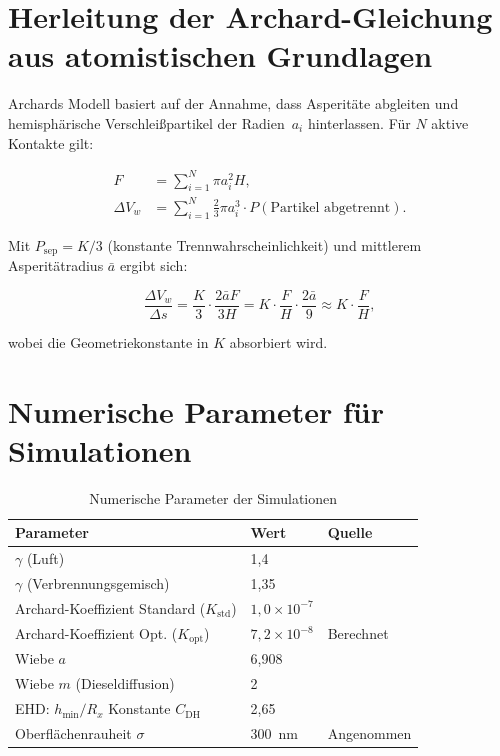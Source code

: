 ﻿\documentclass[12pt,a4paper]{article}
\begin{document}
\appendix
\section{Herleitung der Archard-Gleichung aus atomistischen Grundlagen}
\label{app:archard_herleitung}

Archards Modell basiert auf der Annahme, dass Asperitäte abgleiten und
hemisphärische Verschlei\ss{}partikel der Radien~$a_i$ hinterlassen. Für
$N$ aktive Kontakte gilt:

\begin{align}
  F &= \sum_{i=1}^{N} \pi a_i^2 H, \\
  \Delta V_w &= \sum_{i=1}^{N} \frac{2}{3}\pi a_i^3 \cdot P(\text{Partikel abgetrennt}).
\end{align}

Mit $P_{\mathrm{sep}} = K/3$ (konstante Trennwahrscheinlichkeit) und mittlerem
Asperitätradius $\bar{a}$ ergibt sich:

\begin{equation}
  \frac{\Delta V_w}{\Delta s} = \frac{K}{3} \cdot \frac{2 \bar{a} F}{3H}
  = K \cdot \frac{F}{H} \cdot \frac{2\bar{a}}{9} \approx K \cdot \frac{F}{H},
\end{equation}

wobei die Geometriekonstante in $K$ absorbiert wird.

\section{Numerische Parameter für Simulationen}
\label{app:parameter}

\begin{table}[H]
  \centering
  \caption{Numerische Parameter der Simulationen}
  \label{tab:parameter}
  \begin{tabular}{lll}
    \toprule
    Parameter & Wert & Quelle \\
    \midrule
    $\gamma$ (Luft) & 1{,}4 & \cite{cengel2014} \\
    $\gamma$ (Verbrennungsgemisch) & 1{,}35 & \cite{heywood1988} \\
    Archard-Koeffizient Standard ($K_{\mathrm{std}}$) & $1{,}0 \times 10^{-7}$ & \cite{rabinowicz1995} \\
    Archard-Koeffizient Opt. ($K_{\mathrm{opt}}$) & $7{,}2 \times 10^{-8}$ & Berechnet \\
    Wiebe $a$ & 6{,}908 & \cite{wiebe1970} \\
    Wiebe $m$ (Dieseldiffusion) & 2 & \cite{merker2014} \\
    EHD: $h_{\min}/R_x$ Konstante $C_{\mathrm{DH}}$ & 2{,}65 & \cite{dowson1977} \\
    Oberflächenrauheit $\sigma$ & \SI{300}{\nm} & Angenommen \\
    \bottomrule
  \end{tabular}
\end{table}
\end{document}
